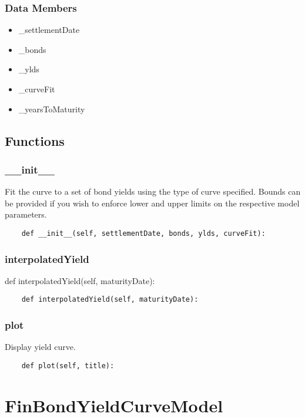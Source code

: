 \documentclass[twoside,11pt]{book}
\begin{document}
\subsubsection*{Data Members}
\begin{itemize}
\item{\_settlementDate}
\item{\_bonds}
\item{\_ylds}
\item{\_curveFit}
\item{\_yearsToMaturity}
\end{itemize}

\subsection*{Functions}

\subsubsection*{{\bf \_\_init\_\_}}
Fit the curve to a set of bond yields using the type of curve  specified. Bounds can be provided if you wish to enforce lower and  upper limits on the respective model parameters.  

\begin{lstlisting}
    def __init__(self, settlementDate, bonds, ylds, curveFit):
\end{lstlisting}

\subsubsection*{{\bf interpolatedYield}}
def interpolatedYield(self, maturityDate): 

\begin{lstlisting}
    def interpolatedYield(self, maturityDate):
\end{lstlisting}

\subsubsection*{{\bf plot}}
Display yield curve.  

\begin{lstlisting}
    def plot(self, title):
\end{lstlisting}

\newpage
\section{FinBondYieldCurveModel}
\end{document}
